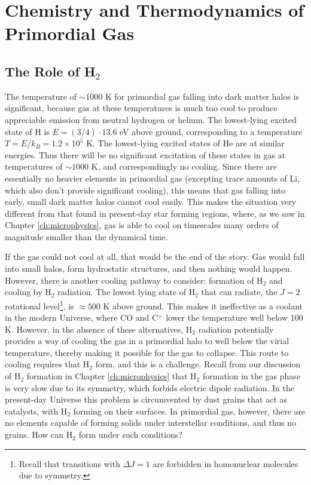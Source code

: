 \section{Chemistry and Thermodynamics of Primordial Gas}

\subsection{The Role of H$_2$}

The temperature of $\sim 1000$ K for primordial gas falling into dark matter halos is significant, because gas at these temperatures is much too cool to produce appreciable emission from neutral hydrogen or helium. The lowest-lying excited state of H is $E = (3/4)\cdot 13.6$ eV above ground, corresponding to a temperature $T = E/k_B = 1.2\times 10^5$ K. The lowest-lying excited states of He are at similar energies. Thus there will be no significant excitation of these states in gas at temperatures of $\sim 1000$ K, and correspondingly no cooling. Since there are essentially no heavier elements in primordial gas (excepting trace amounts of Li, which also don't provide significant cooling), this means that gas falling into early, small dark matter halos cannot cool easily. This makes the situation very different from that found in present-day star forming regions, where, as we saw in Chapter \ref{ch:microphysics}, gas is able to cool on timescales many orders of magnitude smaller than the dynamical time.

If the gas could not cool at all, that would be the end of the story. Gas would fall into small halos, form hydrostatic structures, and then nothing would happen. However, there is another cooling pathway to consider: formation of H$_2$ and cooling by H$_2$ radiation. The lowest lying state of H$_2$ that can radiate, the $J=2$ rotational level\footnote{Recall that transitions with $\Delta J=1$ are forbidden in homonuclear molecules due to symmetry.}, is $\approx 500$ K above ground. This makes it ineffective as a coolant in the modern Universe, where CO and C$^+$ lower the temperature well below 100 K. However, in the absence of these alternatives, H$_2$ radiation potentially provides a way of cooling the gas in a primordial halo to well below the virial temperature, thereby making it possible for the gas to collapse. This route to cooling requires that H$_2$ form, and this is a challenge. Recall from our discussion of H$_2$ formation in Chapter \ref{ch:microphysics} that H$_2$ formation in the gas phase is very slow due to its symmetry, which forbids electric dipole radiation. In the present-day Universe this problem is circumvented by dust grains that act as catalysts, with H$_2$ forming on their surfaces. In primordial gas, however, there are no elements capable of forming solids under interstellar conditions, and thus no grains. How can H$_2$ form under such conditions?

